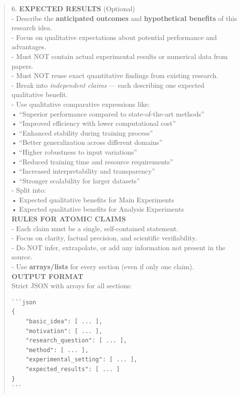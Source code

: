 \begin{quote}
\begin{tcolorbox}[breakable,colback=extraction!20!white, colframe=extraction!60!black, title=\textbf{Prompt for Extraction Agent}]
        6. \textbf{EXPECTED RESULTS} (Optional)\\
        - Describe the \textbf{anticipated outcomes} and \textbf{hypothetical benefits} of this research idea.\\
        - Focus on qualitative expectations about potential performance and advantages.\\
        - Must NOT contain actual experimental results or numerical data from papers.\\
        - Must NOT reuse exact quantitative findings from existing research.\\
        - Break into \textit{independent claims} — each describing one expected qualitative benefit.\\
        - Use qualitative comparative expressions like:\\
        • ``Superior performance compared to state-of-the-art methods''\\
        • ``Improved efficiency with lower computational cost''\\
        • ``Enhanced stability during training process''\\
        • ``Better generalization across different domains''\\
        • ``Higher robustness to input variations''\\
        • ``Reduced training time and resource requirements''\\
        • ``Increased interpretability and transparency''\\
        • ``Stronger scalability for larger datasets''\\
        - Split into:\\
        • Expected qualitative benefits for Main Experiments\\
        • Expected qualitative benefits for Analysis Experiments\\

        \textbf{RULES FOR ATOMIC CLAIMS}\\
        - Each claim must be a single, self-contained statement.\\
        - Focus on clarity, factual precision, and scientific verifiability.\\
        - Do NOT infer, extrapolate, or add any information not present in the source.\\
        - Use \textbf{arrays/lists} for every section (even if only one claim).\\

        \textbf{OUTPUT FORMAT}\\
        Strict JSON with arrays for all sections:\\
        \begin{verbatim}
```json
{
    "basic_idea": [ ... ],
    "motivation": [ ... ],
    "research_question": [ ... ],
    "method": [ ... ],
    "experimental_setting": [ ... ],
    "expected_results": [ ... ]
}
```
        \end{verbatim}


\end{tcolorbox}
\end{quote}
